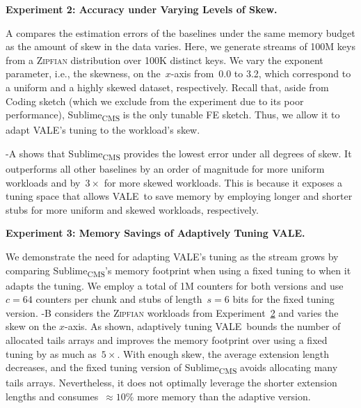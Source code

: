 \documentclass[sigconf]{acmart}
\newcommand{\sketch}{Sublime}
\newcommand{\sketchcms}{\sketch\textsubscript{CMS}\xspace}
\newcommand{\counterencodingabbrv}{VALE}
\begin{document}
\hypertarget{experiment:skew}{\textbf{Experiment 2: Accuracy under Varying Levels of Skew.}}
A compares the estimation errors of the baselines under the same memory budget as the amount of skew in the data varies.
Here, we generate streams of 100M keys from a \textsc{Zipfian} distribution over 100K distinct keys.
We vary the exponent parameter, i.e., the skewness, on the~$x${\nobreakdash-}axis from~0.0 to 3.2, which correspond to a uniform and a highly skewed dataset, respectively.
Recall that, aside from Coding sketch (which we exclude from the experiment due to its poor performance), \sketchcms is the only tunable FE sketch. 
Thus, we allow it to adapt \counterencodingabbrv's tuning to the workload's skew.

-A shows that \sketchcms provides the lowest error under all degrees of skew.
It outperforms all other baselines by an order of magnitude for more uniform workloads and by~$3\times$ for more skewed workloads.
This is because it exposes a tuning space that allows \counterencodingabbrv\ to save memory by employing longer and shorter stubs for more uniform and skewed workloads, respectively. 

\hypertarget{experiment:vale_tuning}{\textbf{Experiment 3: Memory Savings of Adaptively Tuning \counterencodingabbrv.}}
We demonstrate the need for adapting \counterencodingabbrv's tuning as the stream grows by comparing \sketchcms's memory footprint when using a fixed tuning to when it adapts the tuning.
We employ a total of 1M counters for both versions and use~$c=64$ counters per chunk and stubs of length~$s=6$ bits for the fixed tuning version.
-B considers the \textsc{Zipfian} workloads from Experiment~\hyperlink{experiment:skew}{2} and varies the skew on the $x$-axis.
As shown, adaptively tuning \counterencodingabbrv\ bounds the number of allocated tails arrays and improves the memory footprint over using a fixed tuning by as much as~$5\times$.
With enough skew, the average extension length decreases, and the fixed tuning version of \sketchcms avoids allocating many tails arrays.
Nevertheless, it does not optimally leverage the shorter extension lengths and consumes~$\approx 10\%$ more memory than the adaptive version. 
\end{document}
